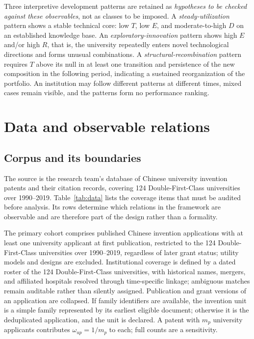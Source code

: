 Three interpretive development patterns are retained as \emph{hypotheses to be
checked against these observables}, not as classes to be imposed. A
\emph{steady-utilization} pattern shows a stable technical core: low $T$, low
$E$, and moderate-to-high $D$ on an established knowledge base. An
\emph{exploratory-innovation} pattern shows high $E$ and/or high $R$, that is,
the university repeatedly enters novel technological directions and forms
unusual combinations. A \emph{structural-recombination} pattern requires $T$
above its null in at least one transition and persistence of the new
composition in the following period, indicating a sustained reorganization of
the portfolio. An institution may follow different patterns at different times,
mixed cases remain visible, and the patterns form no performance ranking.

\section{Data and observable relations}\label{sec:data}
\subsection{Corpus and its boundaries}
The source is the research team's database of Chinese university invention
patents and their citation records, covering 124 Double-First-Class
universities over 1990--2019. Table~\ref{tab:data} lists the coverage items
that must be audited before analysis. Its rows determine which relations in
the framework are observable and are therefore part of the design rather than
a formality.


The primary cohort comprises published Chinese invention applications with at
least one university applicant at first publication, restricted to the 124
Double-First-Class universities over 1990--2019, regardless of later grant
status; utility models and designs are excluded. Institutional coverage is
defined by a dated roster of the 124 Double-First-Class universities, with
historical names, mergers, and affiliated hospitals resolved through
time-specific linkage; ambiguous matches remain auditable rather than silently
assigned. Publication and grant versions
of an application are collapsed. If family identifiers are available, the
invention unit is a simple family represented by its earliest eligible
document; otherwise it is the deduplicated application, and the unit is
declared. A patent with $m_p$ university applicants contributes
$\omega_{up}=1/m_p$ to each; full counts are a sensitivity.

